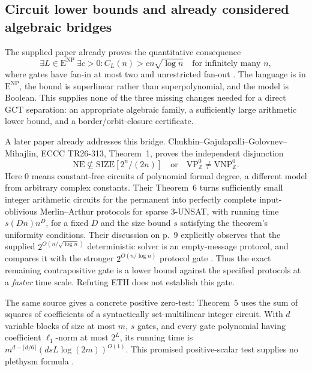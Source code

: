 \subsection{Circuit lower bounds and already considered algebraic bridges}

The supplied paper already proves the quantitative consequence
\[
 \exists L\in\mathrm E^{\mathrm{NP}}\ \exists c>0:
 C_L(n)>c n\sqrt{\log n}\quad\text{for infinitely many }n,
\]
where gates have fan-in at most two and unrestricted fan-out
\cite[Corollary~1.4; Appendix~C.1; \texttt{quantitative-circuits.tex}]{COAI26}.
The language is in \(\mathrm E^{\mathrm{NP}}\), the bound is
superlinear rather than superpolynomial, and the model is Boolean.
This supplies none of the three missing changes needed for a direct
GCT separation: an appropriate algebraic family, a sufficiently large
arithmetic lower bound, and a border/orbit-closure certificate.

A later paper already addresses this bridge.  Chukhin--Gajulapalli--Golovnev--Mihajlin,
ECCC TR26-313, Theorem~1, proves the independent disjunction
\[
 \mathrm{NE}\not\subseteq\mathrm{SIZE}[2^n/(2n)]
 \quad\text{or}\quad
 \mathrm{VP}^{0}_{\mathbb Z}\ne\mathrm{VNP}^{0}_{\mathbb Z}.
\]
Here \(0\) means constant-free circuits of polynomial formal degree,
a different model from arbitrary complex constants.  Their Theorem~6
turns sufficiently small integer arithmetic circuits for the permanent
into perfectly complete input-oblivious Merlin--Arthur protocols for
sparse 3-UNSAT, with running time \(s(Dn)n^D\), for a fixed \(D\)
and the size bound \(s\) satisfying the theorem's uniformity conditions.
Their discussion on p.~9 explicitly observes that the supplied
\(2^{O(n/\sqrt{\log n})}\) deterministic solver is an empty-message
protocol, and compares it with the stronger
\(2^{O(n/\log n)}\) protocol gate \cite[Theorems~1 and~6; pp.~8--9]{CCGGM26}.
Thus the exact remaining contrapositive gate is a lower bound against
the specified protocols at a \emph{faster} time scale.  Refuting ETH
does not establish this gate.

The same source gives a concrete positive zero-test: Theorem~5 uses
the sum of squares of coefficients of a syntactically set-multilinear
integer circuit.  With \(d\) variable blocks of size at most \(m\),
\(s\) gates, and every gate polynomial having coefficient
\(\ell_1\)-norm at most \(2^L\), its running time is
\(m^{d-\lceil d/6\rceil}(dsL\log(2m))^{O(1)}\).
This promised positive-scalar test supplies no plethysm formula
\cite[Theorem~5, \S8.2]{CCGGM26}.

